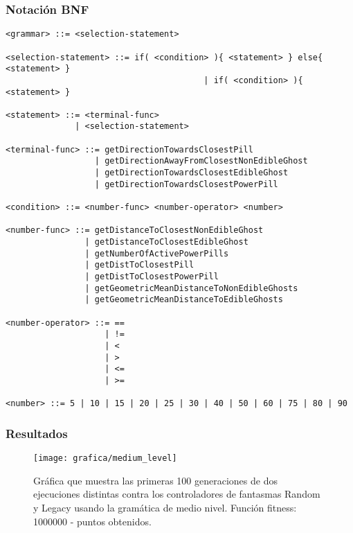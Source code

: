 \subsubsection{Notación BNF}
\begin{lstlisting}[frame=single, breaklines=no, basicstyle=\fontsize{10}{11}\ttfamily, caption={Gramática de medio nivel.}, captionpos=b]
<grammar> ::= <selection-statement>

<selection-statement> ::= if( <condition> ){ <statement> } else{ <statement> }
                                        | if( <condition> ){ <statement> }

<statement> ::= <terminal-func>
              | <selection-statement>

<terminal-func> ::= getDirectionTowardsClosestPill
                  | getDirectionAwayFromClosestNonEdibleGhost
                  | getDirectionTowardsClosestEdibleGhost
                  | getDirectionTowardsClosestPowerPill
                  
<condition> ::= <number-func> <number-operator> <number>

<number-func> ::= getDistanceToClosestNonEdibleGhost
                | getDistanceToClosestEdibleGhost
                | getNumberOfActivePowerPills
                | getDistToClosestPill
                | getDistToClosestPowerPill
                | getGeometricMeanDistanceToNonEdibleGhosts
                | getGeometricMeanDistanceToEdibleGhosts

<number-operator> ::= ==
                    | !=
                    | <
                    | >
                    | <=
                    | >=

<number> ::= 5 | 10 | 15 | 20 | 25 | 30 | 40 | 50 | 60 | 75 | 80 | 90
\end{lstlisting}

\subsubsection{Resultados}
\begin{figure}[H]
\centering
\texttt{[image: grafica/medium\_level]}
\caption{Gráfica que muestra las primeras 100 generaciones de dos ejecuciones distintas contra los controladores de fantasmas Random y Legacy usando la gramática de medio nivel. Función fitness: 1000000 - puntos obtenidos.}
\end{figure}

